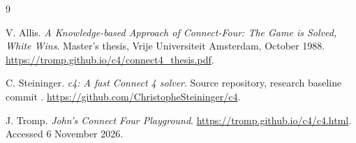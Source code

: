 \documentclass[11pt]{article}
\theoremstyle{definition}
\theoremstyle{remark}
\begin{document}
\begin{thebibliography}{9}
\raggedright
{}
V. Allis.
\emph{A Knowledge-based Approach of Connect-Four: The Game is Solved,
White Wins}.
Master's thesis, Vrije Universiteit Amsterdam, October 1988.
\url{https://tromp.github.io/c4/connect4_thesis.pdf}.

C. Steininger.
\emph{c4: A fast Connect 4 solver}.
Source repository, research baseline commit
.
\url{https://github.com/ChristopheSteininger/c4}.

J. Tromp.
\emph{John's Connect Four Playground}.
\url{https://tromp.github.io/c4/c4.html}.
Accessed 6 November 2026.
\end{thebibliography}
\end{document}

